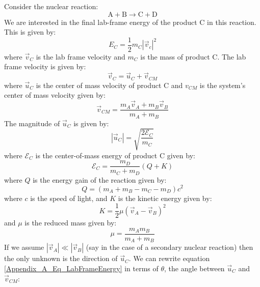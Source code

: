 

	Consider the nuclear reaction:
	\begin{equation}
		\text{A} + \text{B} \rightarrow \text{C} + \text{D}
	\end{equation}
	We are interested in the final lab-frame energy of the product C in this reaction. This is given by:
	\begin{equation}
		E_C = \frac{1}{2} m_C |\vec{v}_c|^2
		\label{Appendix_A_Eq_LabFrameEnergy}
	\end{equation}
	where $\vec{v}_C$ is the lab frame velocity and $m_C$ is the mass of product C. The lab frame velocity is given by:
	\begin{equation}
		\vec{v}_C = \vec{u}_C + \vec{v}_{CM}
	\end{equation}
	where $\vec{u}_C$ is the center of mass velocity of product C and $v_{CM}$ is the system's center of mass velocity given by:
	\begin{equation}
		\vec{v}_{CM} = \frac{m_A\vec{v}_A + m_B\vec{v}_B}{m_A + m_B}
	\end{equation}
	The magnitude of $\vec{u}_C$ is given by:
	\begin{equation}
		|\vec{u}_C| = \sqrt{\frac{2\mathcal{E}_C}{m_C}}
	\end{equation}
	where $\mathcal{E}_C$ is the center-of-mass energy of product C given by:
	\begin{equation}
		\mathcal{E}_C = \frac{m_D}{m_C+m_D} \left(Q + K\right)
	\end{equation}
	where $Q$ is the energy gain of the reaction given by:
	\begin{equation}
		Q = \left(m_A + m_B - m_C - m_D\right)c^2
	\end{equation}
	where $c$ is the speed of light, and $K$ is the kinetic energy given by:
	\begin{equation}
		K = \frac{1}{2}\mu \left(\vec{v}_A - \vec{v}_B\right)^2
	\end{equation}
	and $\mu$ is the reduced mass given by:
	\begin{equation}
		\mu = \frac{m_A m_B}{m_A + m_B}
	\end{equation}
	If we assume $|\vec{v}_A| \ll |\vec{v}_B|$ (say in the case of a secondary nuclear reaction) then the only unknown is the direction of $\vec{u}_C$. We can rewrite equation \ref{Appendix_A_Eq_LabFrameEnergy} in terms of $\theta$, the angle between $\vec{u}_C$ and $\vec{v}_{CM}$:
	
